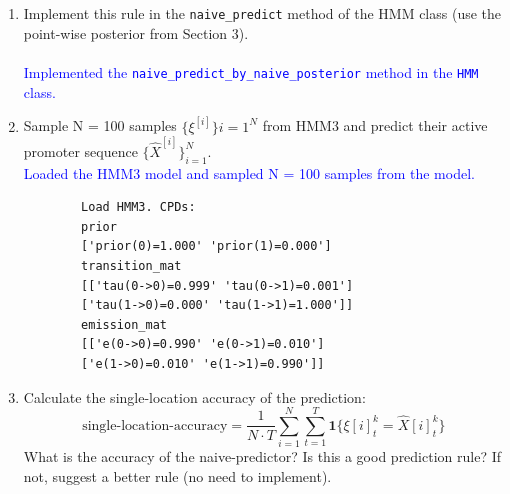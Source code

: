 \documentclass[a4 paper]{article}
\begin{document}
\begin{enumerate}
    \item Implement this rule in the \texttt{naive\_predict} method of the HMM class (use the point-wise posterior from Section 3). \\
    \\
    \textcolor{blue}{
        Implemented the \texttt{naive\_predict\_by\_naive\_posterior} method in the \texttt{HMM} class.
    }

    \item Sample  N = 100  samples  $\{\xi^{[i]}\}{i=1}^N$  from HMM3 and predict their active promoter sequence  $\{\hat{X}^{[i]}\}_{i=1}^N $.
    \\
    \textcolor{blue}{
        Loaded the HMM3 model and sampled  N = 100  samples from the model.
    }

    \begin{verbatim}
        Load HMM3. CPDs:
        prior
        ['prior(0)=1.000' 'prior(1)=0.000']
        transition_mat
        [['tau(0->0)=0.999' 'tau(0->1)=0.001']
        ['tau(1->0)=0.000' 'tau(1->1)=1.000']]
        emission_mat
        [['e(0->0)=0.990' 'e(0->1)=0.010']
        ['e(1->0)=0.010' 'e(1->1)=0.990']]
    \end{verbatim}

    \item Calculate the single-location accuracy of the prediction:
        \[
            \text{single-location-accuracy} = \frac{1}{N \cdot T} \sum_{i=1}^N \sum_{t=1}^T \mathbf{1}\{ \xi[i]^{k}_t = \hat{X}[i]^{k}_t \}
        \]
        What is the accuracy of the naive-predictor? Is this a good prediction rule? If not, suggest a better rule (no need to implement).
    \\


\end{enumerate}
\end{document}
